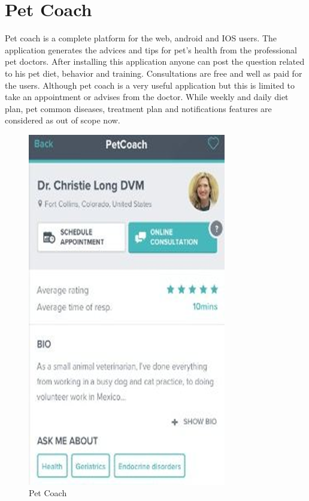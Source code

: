 \section{Pet Coach\cite{petcoach}}
Pet coach is a complete platform for the web, android and IOS users. The application generates the advices and tips for pet’s health from the professional pet doctors. After installing this application anyone can post the question related to his pet diet, behavior and training. Consultations are free and well as paid for the users. Although pet coach is a very useful application but this is limited to take an appointment or advises from the doctor. While weekly and daily diet plan, pet common diseases, treatment plan and notifications features are considered as out of scope now.
\begin{figure}[H]
  \centering
    \includegraphics[scale=0.3]{26petcoach}
      \caption{Pet Coach}
\end{figure}
